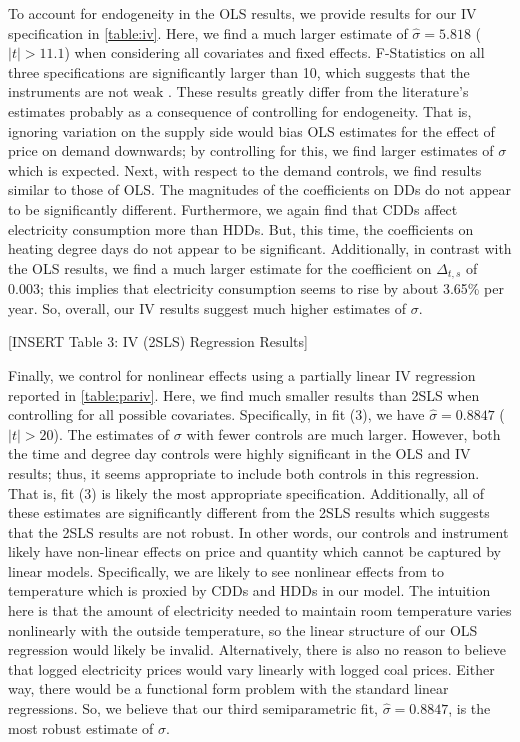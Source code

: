 \documentclass[11pt,a4paper,leqno]{extarticle}
\begin{document}
	
	To account for endogeneity in the OLS results, we provide results for our IV specification in \autoref{table:iv}. Here, we find a much larger estimate of $\hat{\sigma}  = 5.818$ ($|t| > 11.1$) when considering all covariates and fixed effects. F-Statistics on all three specifications are significantly larger than 10, which suggests that the instruments are not weak \citep{SS1997}. These results greatly differ from the literature's estimates probably as a consequence of controlling for endogeneity. That is, ignoring variation on the supply side would bias OLS estimates for the effect of price on demand downwards; by controlling for this, we find larger estimates of $\sigma$ which is expected. Next, with respect to the demand controls, we find results similar to those of OLS. The magnitudes of the coefficients on DDs do not appear to be significantly different. Furthermore, we again find that CDDs affect electricity consumption more than HDDs. But, this time, the coefficients on heating degree days do not appear to be significant. Additionally, in contrast with the OLS results, we find a much larger estimate for the coefficient on $\Delta_{t,s}$ of $0.003$; this implies that electricity consumption seems to rise by about 3.65\% per year. So, overall, our IV results suggest much higher estimates of $\sigma$. 
	
	
	\vspace{0.15in}
	\begin{center}
		[INSERT Table 3: IV (2SLS) Regression Results]
	\end{center}
	\vspace{0.15in}
	
	Finally, we control for nonlinear effects using a partially linear IV regression reported in \autoref{table:pariv}. Here, we find much smaller results than 2SLS when controlling for all possible covariates. Specifically, in fit (3), we have $\hat{\sigma} = 0.8847$ ($|t| > 20$). The estimates of $\sigma$ with fewer controls are much larger. However, both the time and degree day controls were highly significant in the OLS and IV results; thus, it seems appropriate to include both controls in this regression. That is, fit (3) is likely the most appropriate specification. Additionally, all of these estimates are significantly different from the 2SLS results which suggests that the 2SLS results are not robust. In other words, our controls and instrument likely have non-linear effects on price and quantity which cannot be captured by linear models. Specifically, we are likely to see nonlinear effects from to temperature which is proxied by CDDs and HDDs in our model. The intuition here is that the amount of electricity needed to maintain room temperature varies nonlinearly with the outside temperature, so the linear structure of our OLS regression would likely be invalid. Alternatively, there is also no reason to believe that logged electricity prices would vary linearly with logged coal prices.  Either way, there would be a functional form problem with the standard linear regressions. So, we believe that our third semiparametric fit, $\hat{\sigma} = 0.8847$, is the most robust estimate of $\sigma$. 
	
\end{document}

